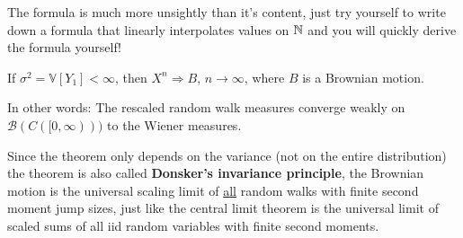 		The formula is much more unsightly than it's content, just try yourself to write down a formula that linearly interpolates values on $\mathbb{N}$ and you will quickly derive the formula yourself!
\begin{lSatzHerz}
\begin{theorem}\label{thm:donsker}
	If $\sigma^2 = \mathbb{V}[Y_1]<\infty$, then $X^n \Rightarrow B$, $n\to\infty$, where $B$ is a Brownian motion.\smallskip

	In other words: The rescaled random walk measures converge weakly on $\mathcal B(C([0,\infty)))$ to the Wiener measures.
\end{theorem}
\end{lSatzHerz}
Since the theorem only depends on the variance (not on the entire distribution) the theorem is also called \textbf{Donsker's invariance principle}, the Brownian motion is the universal scaling limit of \underline{all} random walks with finite second moment jump sizes, just like the central limit theorem is the universal limit of scaled sums of all iid random variables with finite second moments.
